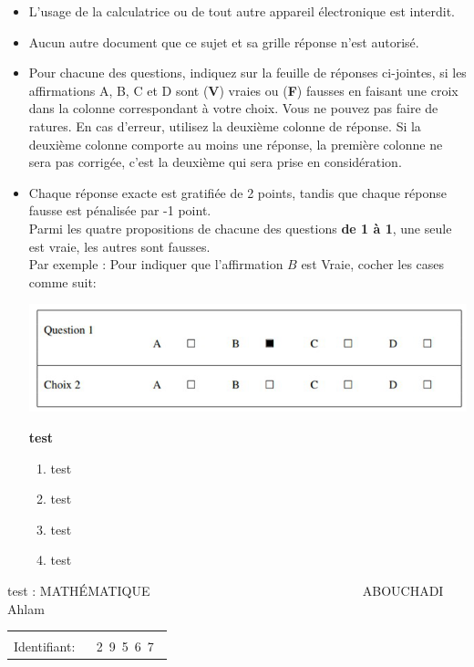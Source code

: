 \documentclass{book}%
\begin{document}
\begin{itemize}%
\item%
L'usage de la calculatrice ou de tout autre appareil électronique est interdit.%
\item%
Aucun autre document que ce sujet et sa grille réponse n'est autorisé.%
\item%
Pour chacune des questions, indiquez sur la feuille de réponses ci-jointes, si les affirmations A, B, C et D sont (\textbf{V}) vraies ou (\textbf{F}) fausses en faisant une croix dans la colonne correspondant à votre choix. Vous ne pouvez pas faire de ratures. En cas d'erreur, utilisez la deuxième colonne de réponse. Si la deuxième colonne comporte au moins une réponse, la première colonne ne sera pas corrigée, c'est la deuxième qui sera prise en considération.%
\item%
Chaque réponse exacte est gratifiée de 2 points, tandis que chaque réponse fausse est pénalisée par -1 point. \\ 	Parmi les quatre propositions de chacune des questions \textbf{de 1 à 1}, une seule est vraie, les autres sont fausses. \\ 	Par exemple : Pour indiquer que l'affirmation $B$ est Vraie, cocher les cases comme suit:  \\ \begin{center}	\includegraphics[scale=0.8]{reponses.png} \end{center}%
\thispagestyle{empty}%
\begin{exercise}%
\textbf{test }%
\begin{enumerate}[label=\textbf{\Alph*. }]%
\item%
test%
\item%
test%
\item%
test%
\item%
test%
\end{enumerate}%
\end{exercise}%
\end{itemize}%
\newpage%
\thispagestyle{empty}%
test : MATHÉMATIQUE $\qquad \qquad \qquad \qquad \qquad \qquad \qquad \qquad$ ABOUCHADI Ahlam%
\begin{flushright}%
\begin{tabular}{|l|}%
\hline%
 \\%
\thispagestyle{empty}%
Identifiant: $\quad$ {\Large 2~9~5~6~7~}%
 \\%
\hline%
\end{tabular}%
\end{flushright}%
\end{document}

